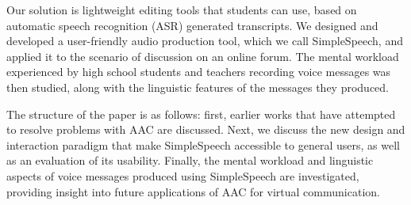 Our solution is lightweight editing tools that students can use, based on automatic speech recognition (ASR) generated transcripts.
We designed and developed a user-friendly audio production tool, which we call SimpleSpeech, and applied it to the scenario of discussion on an online forum. 
The mental workload experienced by high school students and teachers recording voice messages was then studied, along with the linguistic features of the messages they produced.

The structure of the paper is as follows: first, earlier works that have attempted to resolve problems with AAC are discussed. 
Next, we discuss the new design and interaction paradigm that make SimpleSpeech accessible to general users, as well as an evaluation of its usability. 
Finally, the mental workload and linguistic aspects of voice messages produced using SimpleSpeech are investigated, providing insight into future applications of AAC for virtual communication.
